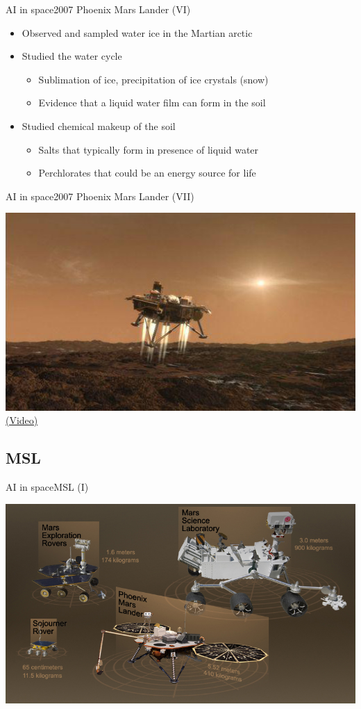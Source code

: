 \documentclass[10pt,compress]{beamer} %
\begin{document}
{\begin{frame}{AI in space}{2007 Phoenix Mars Lander (VI)}
		\begin{itemize}
		\item Observed and sampled water ice in the Martian arctic
		\item Studied the water cycle 
			\begin{itemize}
		 	\item Sublimation of ice, precipitation of ice crystals (snow)
		  	\item Evidence that a liquid water film can form in the soil
			\end{itemize}
		\item Studied chemical makeup of the soil 
		  	\begin{itemize}
		   	\item Salts that typically form in presence of liquid water
		    \item Perchlorates that could be an energy source for life	
			\end{itemize}
		\end{itemize}
	\end{frame}

	\begin{frame}{AI in space}{2007 Phoenix Mars Lander (VII)}
		\begin{center}
			\includegraphics[width=0.8\linewidth]{figs/phoenix_landing.jpg}\\
			\href{https://www.youtube.com/watch?v=j72quVM7c9Y}{(Video)}
		\end{center}
	\end{frame}

	\subsection{MSL}
	\begin{frame}{AI in space}{MSL (I)}
		\begin{center}
			\includegraphics[width=0.8\linewidth]{figs/comparison.jpg}
		\end{center}
	\end{frame}

}
\end{document}
